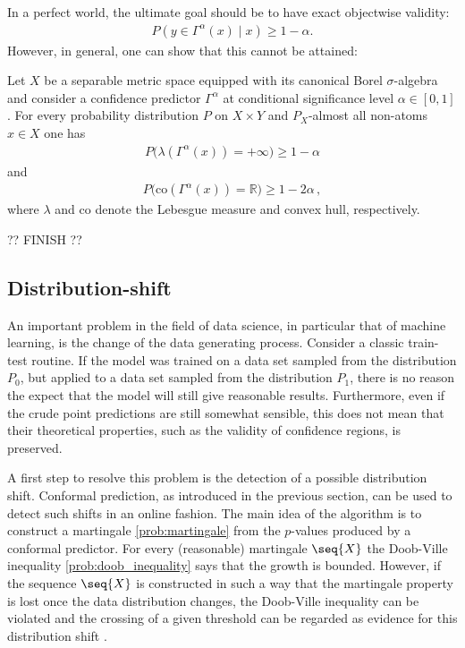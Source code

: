     In a perfect world, the ultimate goal should be to have exact objectwise validity:
    \begin{gather}
        P(y\in\Gamma^\alpha(x)\mid x)\geq 1-\alpha.
    \end{gather}
    However, in general, one can show that this cannot be attained:
    \begin{property}[No-go theorem]
        Let $X$ be a separable metric space equipped with its canonical Borel $\sigma$-algebra and consider a confidence predictor $\Gamma^\alpha$ at conditional significance level $\alpha\in[0,1]$. For every probability distribution $P$ on $X\times Y$ and $P_X$-almost all non-atoms $x\in X$ one has
        \begin{gather}
            P\big(\lambda(\Gamma^\alpha(x))=+\infty\big)\geq 1-\alpha
        \end{gather}
        and
        \begin{gather}
            P\big(\mathrm{co}(\Gamma^\alpha(x))=\mathbb{R}\big)\geq 1-2\alpha\,,
        \end{gather}
        where $\lambda$ and $\mathrm{co}$ denote the Lebesgue measure and convex hull, respectively.
    \end{property}

    ?? FINISH ??

\subsection{Distribution-shift}

    An important problem in the field of data science, in particular that of machine learning, is the change of the data generating process. Consider a classic train-test routine. If the model was trained on a data set sampled from the distribution $P_0$, but applied to a data set sampled from the distribution $P_1$, there is no reason the expect that the model will still give reasonable results. Furthermore, even if the crude point predictions are still somewhat sensible, this does not mean that their theoretical properties, such as the validity of confidence regions, is preserved.

    A first step to resolve this problem is the detection of a possible distribution shift. Conformal prediction, as introduced in the previous section, can be used to detect such shifts in an online fashion. The main idea of the algorithm is to construct a martingale \ref{prob:martingale} from the $p$-values produced by a conformal predictor. For every (reasonable) martingale $\seq{X}$ the Doob-Ville inequality \ref{prob:doob_inequality} says that the growth is bounded. However, if the sequence $\seq{X}$ is constructed in such a way that the martingale property is lost once the data distribution changes, the Doob-Ville inequality can be violated and the crossing of a given threshold can be regarded as evidence for this distribution shift \cite{cp_all}.

